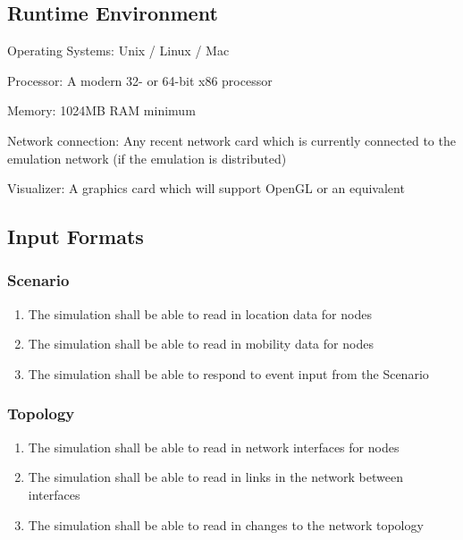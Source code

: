 \documentclass[titlepage]{article}
\begin{document}

\subsection{Runtime Environment} 
\begin{itemize*}
    \item Operating Systems:  Unix / Linux / Mac
    \item Processor:  A modern 32- or 64-bit x86 processor
    \item Memory:  1024MB RAM minimum
    \item Network connection:  Any recent network card which is currently connected to the emulation network (if the emulation is distributed)
    \item Visualizer:  A graphics card which will support OpenGL or an equivalent
\end{itemize*}


\subsection{Input Formats%
  \label{input-formats}%
}

\subsubsection{Scenario}
\begin{enumerate}
    \item The simulation shall be able to read in location data for nodes
		\item The simulation shall be able to read in mobility data for nodes
		\item The simulation shall be able to respond to event input from the Scenario
\end{enumerate}

\subsubsection{Topology}
\begin{enumerate}
    \item The simulation shall be able to read in network interfaces for nodes
    \item The simulation shall be able to read in links in the network between interfaces
    \item The simulation shall be able to read in changes to the network topology
\end{enumerate}
\end{document}
